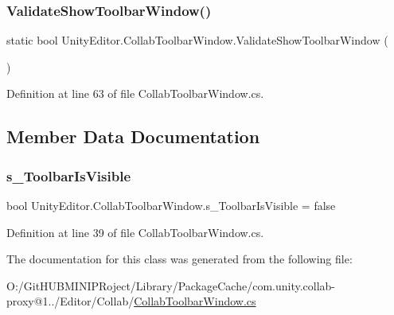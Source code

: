 \subsubsection{\texorpdfstring{ValidateShowToolbarWindow()}{ValidateShowToolbarWindow()}}
{\footnotesize\ttfamily static bool Unity\+Editor.\+Collab\+Toolbar\+Window.\+Validate\+Show\+Toolbar\+Window (\begin{DoxyParamCaption}{ }\end{DoxyParamCaption})\hspace{0.3cm}{\ttfamily [static]}}



Definition at line 63 of file Collab\+Toolbar\+Window.\+cs.



\subsection{Member Data Documentation}
\mbox{\label{class_unity_editor_1_1_collab_toolbar_window_a717c4c997c13151347d5cfd47b7bb16d}} 
\subsubsection{\texorpdfstring{s\_ToolbarIsVisible}{s\_ToolbarIsVisible}}
{\footnotesize\ttfamily bool Unity\+Editor.\+Collab\+Toolbar\+Window.\+s\+\_\+\+Toolbar\+Is\+Visible = false\hspace{0.3cm}{\ttfamily [static]}}



Definition at line 39 of file Collab\+Toolbar\+Window.\+cs.



The documentation for this class was generated from the following file\+:\begin{DoxyCompactItemize}
\item 
O\+:/\+Git\+H\+U\+B\+M\+I\+N\+I\+P\+Roject/\+Library/\+Package\+Cache/com.\+unity.\+collab-\/proxy@1../\+Editor/\+Collab/\mbox{\hyperlink{_collab_toolbar_window_8cs}{Collab\+Toolbar\+Window.\+cs}}\end{DoxyCompactItemize}
